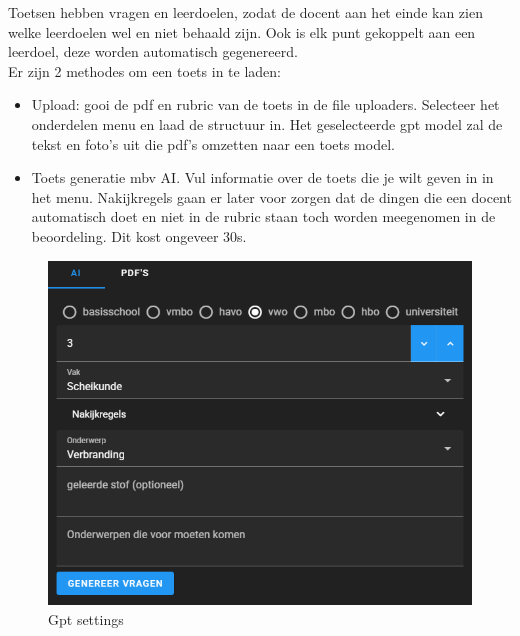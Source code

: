 \documentclass[12pt]{article}
\begin{document}
Toetsen hebben vragen en leerdoelen, zodat de docent aan het einde kan zien welke leerdoelen wel en niet behaald zijn. Ook is elk punt gekoppelt aan een leerdoel, deze worden automatisch gegenereerd.\\
Er zijn 2 methodes om een toets in te laden:\\
\begin{itemize}
    \item Upload: gooi de pdf en rubric van de toets in de file uploaders. Selecteer het onderdelen menu en laad de structuur in. Het geselecteerde gpt model zal de tekst en foto's uit die pdf's omzetten naar een toets model.
    \item Toets generatie mbv AI. Vul informatie over de toets die je wilt geven in in het menu. Nakijkregels gaan er later voor zorgen dat de dingen die een docent automatisch doet en niet in de rubric staan toch worden meegenomen in de beoordeling. Dit kost ongeveer 30s.
\end{itemize}
\begin{figure}[H]
    \centering
    \includegraphics[width=\linewidth]{./images/demo/generation/settings.png}
    \caption{Gpt settings}
    \label{fig:gpt-gen-settings}
\end{figure}
\pagebreak
\end{document}
